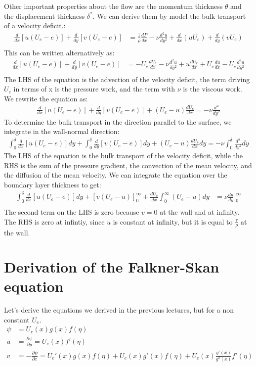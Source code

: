 \documentclass{article}
\begin{document}
Other important properties about the flow are the momentum thickness $\theta$ and the displacement thickness $\delta^*$. We can derive them by model the bulk transport of a velocity deficit.:
\begin{align*}
    \frac{d}{dx}[u(U_e-e)]+\frac{d}{dy}[v(U_e-e)] & = \frac{1}{\rho}\frac{dP}{dx}-\nu \frac{d^2u}{dy^2}+\frac{d}{dx}(uU_e)+\frac{d}{dy}(vU_e) \\
\end{align*}
This can be written alternatively as:
\begin{align*}
    \frac{d}{dx}[u(U_e-e)]+\frac{d}{dy}[v(U_e-e)] & = -U_e\frac{dU_e}{dx}-\nu \frac{d^2u}{dy^2}+u\frac{dU_e}{dx}+U_e\frac{du}{dx}-U_e\frac{d^2u}{dy^2} \\
\end{align*}
The LHS of the equation is the advection of the velocity deficit, the term driving $U_e$ in terms of x is the pressure work, and the term with $\nu$ is the viscous work.\\
We rewrite the equation as:
\begin{align*}
    \frac{d}{dx}[u(U_e-e)]+\frac{d}{dy}[v(U_e-e)]+(U_e-u)\frac{dU_e}{dx}=-\nu\frac{d^u}{dy^2}
\end{align*}
To determine the bulk transport in the direction parallel to the surface, we integrate in the wall-normal direction:
\begin{align*}
    \int_0^{\delta} \frac{d}{dx}[u(U_e-e)]dy+\int_0^{\delta} \frac{d}{dy}[v(U_e-e)]dy+(U_e-u)\frac{dU_e}{dx}dy=-\nu\int_0^{\delta}\frac{d^u}{dy^2}dy
\end{align*}
The LHS of the equation is the bulk transport of the velocity deficit, while the RHS is the sum of the pressure gradient, the convection of the mean velocity, and the diffusion of the mean velocity. We can integrate the equation over the boundary layer thickness to get:
\begin{align*}
    \int_0^{\delta} \frac{d}{dx}[u(U_e-e)]dy+[v(U_e-u)]_0^\infty +\frac{dU_e}{dx}\int_0^\infty (U_e-u)dy & = \nu \frac{du}{dy}|_0^\infty\\
\end{align*}
The second term on the LHS is zero because $v=0$ at the wall and at infinity. The RHS is zero at infintiy, since $u$ is constant at infinity, but it is equal to $\frac{\tau}{\rho}$ at the wall.


\appendix
\section{Derivation of the Falkner-Skan equation}
Let's derive the equations we derived in the previous lectures, but for a non constant $U_e$.
\begin{align*}
    \psi & =U_e(x)g(x)f(\eta) \\
    u & =\frac{\partial\psi}{\partial y}=U_e(x)f'(\eta) \\
    v & =-\frac{\partial\psi}{\partial x}=U_e'(x)g(x)f(\eta)+U_e(x)g'(x)f(\eta)+U_e(x)\frac{g'(x)}{g^2(x)}f'(\eta) \\
\end{align*}
\end{document}
